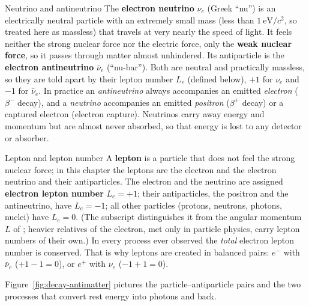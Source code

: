 \begin{defbox}{Neutrino and antineutrino}
The \textbf{electron neutrino} $\nu_e$ (Greek ``nu'') is an electrically neutral particle with an
extremely small mass (less than $\SI{1}{\eV}/c^2$, so treated here as massless) that travels at very
nearly the speed of light. It feels neither the strong nuclear force nor the electric force, only the
\textbf{weak nuclear force}, so it passes through matter almost unhindered. Its antiparticle is the
\textbf{electron antineutrino} $\bar\nu_e$ (``nu-bar''). Both are neutral and practically massless, so
they are told apart by their lepton number $L_e$ (defined below), $+1$ for $\nu_e$ and $-1$ for $\bar\nu_e$. In practice an
\emph{antineutrino} always accompanies an emitted \emph{electron} ($\beta^-$ decay), and a \emph{neutrino}
accompanies an emitted \emph{positron} ($\beta^+$ decay) or a captured electron (electron capture).
Neutrinos carry away energy and momentum but are almost never absorbed, so that energy is lost to any
detector or absorber.
\end{defbox}

\begin{defbox}{Lepton and lepton number}
A \textbf{lepton} is a particle that does not feel the strong nuclear force; in this chapter the leptons
are the electron and the electron neutrino and their antiparticles. The electron and the neutrino are
assigned \textbf{electron lepton number} $L_e=+1$; their antiparticles, the positron and the antineutrino, have
$L_e=-1$; all other particles (protons, neutrons, photons, nuclei) have $L_e=0$. (The subscript distinguishes it from the
angular momentum $L$ of ; heavier relatives of the electron, met only in particle
physics, carry lepton numbers of their own.) In every process ever observed the \emph{total} electron
lepton number is conserved. That is why leptons are created in balanced pairs:
$e^-$ with $\bar\nu_e$ ($+1-1=0$), or $e^+$ with $\nu_e$ ($-1+1=0$).
\end{defbox}

Figure~\ref{fig:decay-antimatter} pictures the particle--antiparticle pairs and the two processes that
convert rest energy into photons and back.

\begin{figure}[htbp]
\centering
{}
\end{figure}

